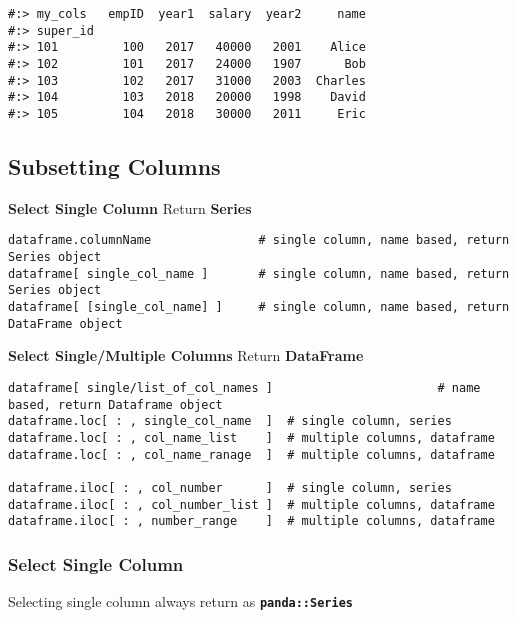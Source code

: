 \documentclass[
]{book}
\begin{document}
\begin{verbatim}
#:> my_cols   empID  year1  salary  year2     name
#:> super_id                                      
#:> 101         100   2017   40000   2001    Alice
#:> 102         101   2017   24000   1907      Bob
#:> 103         102   2017   31000   2003  Charles
#:> 104         103   2018   20000   1998    David
#:> 105         104   2018   30000   2011     Eric
\end{verbatim}

\hypertarget{subsetting-columns}{%
\subsection{Subsetting Columns}\label{subsetting-columns}}

\textbf{Select Single Column} Return \textbf{Series}

\begin{verbatim}
dataframe.columnName               # single column, name based, return Series object
dataframe[ single_col_name ]       # single column, name based, return Series object
dataframe[ [single_col_name] ]     # single column, name based, return DataFrame object
\end{verbatim}

\textbf{Select Single/Multiple Columns} Return \textbf{DataFrame}

\begin{verbatim}
dataframe[ single/list_of_col_names ]                       # name based, return Dataframe object
dataframe.loc[ : , single_col_name  ]  # single column, series
dataframe.loc[ : , col_name_list    ]  # multiple columns, dataframe
dataframe.loc[ : , col_name_ranage  ]  # multiple columns, dataframe

dataframe.iloc[ : , col_number      ]  # single column, series
dataframe.iloc[ : , col_number_list ]  # multiple columns, dataframe
dataframe.iloc[ : , number_range    ]  # multiple columns, dataframe
\end{verbatim}

\hypertarget{select-single-column}{%
\subsubsection{Select Single Column}\label{select-single-column}}

Selecting single column always return as \textbf{\texttt{panda::Series}}
\end{document}
